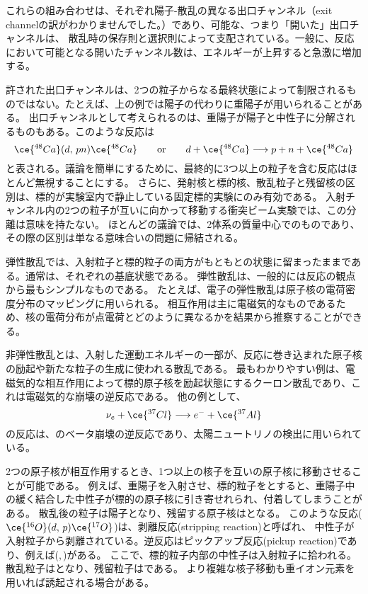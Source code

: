 \documentclass[a4paper,11pt,titlepage,uplatex]{jsarticle}
\begin{document}
これらの組み合わせは、それぞれ陽子-散乱の異なる出口チャンネル（exit channelの訳がわかりませんでした。）であり、可能な、つまり「開いた」出口チャンネルは、
散乱時の保存則と選択則によって支配されている。一般に、反応において可能となる開いたチャンネル数は、エネルギーが上昇すると急激に増加する。

許された出口チャンネルは、2つの粒子からなる最終状態によって制限されるものではない。たとえば、上の例では陽子の代わりに重陽子が用いられることがある。
出口チャンネルとして考えられるのは、重陽子が陽子と中性子に分解されるものもある。このような反応は
\begin{equation}
	\ce{^{48}Ca}(d,\,pn)\ce{^{48}Ca}\qquad\text{or}\qquad d+\ce{^{48}Ca}\longrightarrow p+n+\ce{^{48}Ca}
\end{equation}
と表される。議論を簡単にするために、最終的に3つ以上の粒子を含む反応はほとんど無視することにする。
さらに、発射核と標的核、散乱粒子と残留核の区別は、標的が実験室内で静止している固定標的実験にのみ有効である。
入射チャンネル内の2つの粒子が互いに向かって移動する衝突ビーム実験では、この分離は意味を持たない。
ほとんどの議論では、2体系の質量中心でのものであり、その際の区別は単なる意味合いの問題に帰結される。

弾性散乱では、入射粒子と標的粒子の両方がもともとの状態に留まったままである。通常は、それぞれの基底状態である。
弾性散乱は、一般的には反応の観点から最もシンプルなものである。
たとえば、電子の弾性散乱は原子核の電荷密度分布のマッピングに用いられる。
相互作用は主に電磁気的なものであるため、核の電荷分布が点電荷とどのように異なるかを結果から推察することができる。

非弾性散乱とは、入射した運動エネルギーの一部が、反応に巻き込まれた原子核の励起や新たな粒子の生成に使われる散乱である。
最もわかりやすい例は、電磁気的な相互作用によって標的原子核を励起状態にするクーロン散乱であり、これは電磁気的な崩壊の逆反応である。
他の例として、
\begin{equation}
	\nu_e + \ce{^{37}Cl}\longrightarrow e^- + \ce{^{37}Al}
\end{equation}
の反応は、のベータ崩壊の逆反応であり、太陽ニュートリノの検出に用いられている。

2つの原子核が相互作用するとき、1つ以上の核子を互いの原子核に移動させることが可能である。
例えば、重陽子を入射させ、標的粒子をとすると、重陽子中の緩く結合した中性子が標的の原子核に引き寄せれられ、付着してしまうことがある。
散乱後の粒子は陽子となり、残留する原子核はとなる。
このような反応($\ce{^{16}O}(d,\,p)\ce{^{17}O}$)は、剥離反応(stripping reaction)と呼ばれ、
中性子が入射粒子から剥離されている。逆反応はピックアップ反応(pickup reaction)であり、例えば(,\,)がある。
ここで、標的粒子内部の中性子は入射粒子に拾われる。散乱粒子はとなり、残留粒子はである。
より複雑な核子移動も重イオン元素を用いれば誘起される場合がある。
\end{document}
